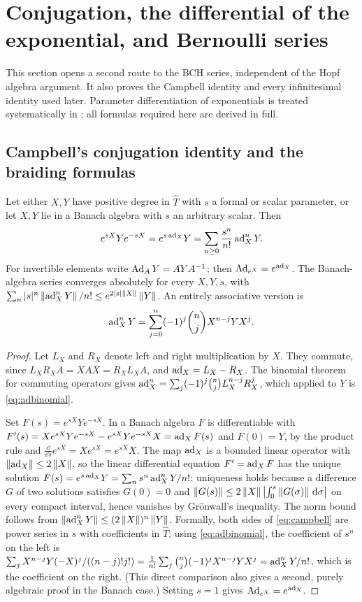 \section{Conjugation, the differential of the exponential, and Bernoulli series}\label{sec:differential}
This section opens a second route to the BCH series, independent of the Hopf
algebra argument. It also proves the Campbell identity and every
infinitesimal identity used later. Parameter differentiation of exponentials
is treated systematically in \cite{wilcox}; all formulas required here are
derived in full.

\subsection{Campbell's conjugation identity and the braiding formulas}
\begin{theorem}\label{thm:campbell}
Let either $X,Y$ have positive degree in $\widehat T$ with $s$ a formal or
scalar parameter, or let $X,Y$ lie in a Banach algebra with $s$ an
arbitrary scalar. Then
\begin{equation}\label{eq:campbell}
 e^{sX}Ye^{-sX}=e^{s\operatorname{ad}_X}Y=\sum_{n\geq0}\frac{s^n}{n!}\operatorname{ad}_X^nY.
\end{equation}
For invertible elements write $\operatorname{Ad}_AY=AYA^{-1}$; then
$\operatorname{Ad}_{e^X}=e^{\operatorname{ad}_X}$. The Banach-algebra series converges absolutely for
every $X,Y,s$, with
$\sum_n|s|^n\left\lVert\operatorname{ad}_X^nY\right\rVert/n!\leq e^{2|s|\left\lVert X\right\rVert}\left\lVert Y\right\rVert$.
An entirely associative version is
\begin{equation}\label{eq:adbinomial}
 \operatorname{ad}_X^nY=\sum_{j=0}^{n}(-1)^j\binom nj X^{n-j}YX^j.
\end{equation}
\end{theorem}
\begin{proof}
Let $L_X$ and $R_X$ denote left and right multiplication by $X$. They
commute, since $L_XR_XA=XAX=R_XL_XA$, and $\operatorname{ad}_X=L_X-R_X$. The binomial
theorem for commuting operators gives
$\operatorname{ad}_X^n=\sum_j(-1)^j\binom njL_X^{n-j}R_X^j$, which applied to $Y$ is
\eqref{eq:adbinomial}.

Set $F(s)=e^{sX}Ye^{-sX}$. In a Banach algebra $F$ is differentiable with
$F'(s)=Xe^{sX}Ye^{-sX}-e^{sX}Ye^{-sX}X=\operatorname{ad}_XF(s)$ and $F(0)=Y$, by the
product rule and $\frac{\dd}{\dd s}e^{sX}=Xe^{sX}=e^{sX}X$. The map
$\operatorname{ad}_X$ is a bounded linear operator with $\left\lVert\operatorname{ad}_X\right\rVert\leq2\left\lVert X\right\rVert$, so the
linear differential equation $F'=\operatorname{ad}_XF$ has the unique solution
$F(s)=e^{s\operatorname{ad}_X}Y=\sum_ns^n\operatorname{ad}_X^nY/n!$; uniqueness holds because a
difference $G$ of two solutions satisfies $G(0)=0$ and
$\left\lVert G(s)\right\rVert\leq2\left\lVert X\right\rVert\bigl|\int_0^s\left\lVert G(\sigma)\right\rVert\,\mathrm{d}\sigma\bigr|$ on
every compact interval, hence vanishes by Gr\"onwall's inequality. The norm bound follows from $\left\lVert\operatorname{ad}_X^nY\right\rVert\leq(2\left\lVert X\right\rVert)^n\left\lVert Y\right\rVert$.
Formally, both sides of \eqref{eq:campbell} are power series in $s$ with
coefficients in $\widehat T$; using \eqref{eq:adbinomial}, the coefficient
of $s^n$ on the left is
$\sum_{j}X^{n-j}Y(-X)^j/((n-j)!j!)=\frac1{n!}\sum_j\binom nj(-1)^jX^{n-j}YX^j
=\operatorname{ad}_X^nY/n!$, which is the coefficient on the right. (This direct comparison
also gives a second, purely algebraic proof in the Banach case.) Setting
$s=1$ gives $\operatorname{Ad}_{e^X}=e^{\operatorname{ad}_X}$.
\end{proof}

